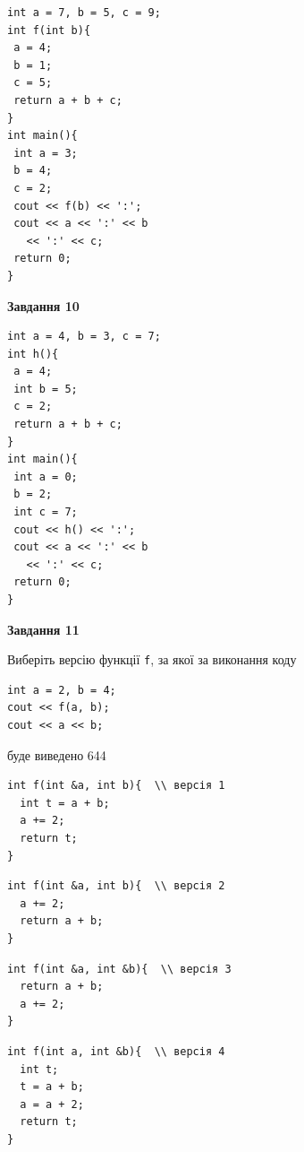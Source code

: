 \documentclass[12pt, ukrainian]{article}
\def\code#1{\Verb!#1!}
\begin{document}
{\begin {large}
\begin{minipage}[t]{7.0cm}
\begin{verbatim}
int a = 7, b = 5, c = 9;
int f(int b){
 a = 4;
 b = 1;
 c = 5;
 return a + b + c;
}
int main(){
 int a = 3;
 b = 4;
 c = 2;
 cout << f(b) << ':';
 cout << a << ':' << b 
   << ':' << c;
 return 0;
}
\end{verbatim}



\begin{center}
\textbf{Завдання 10}
\end{center}
\vspace{-8mm}

\begin{verbatim}
int a = 4, b = 3, c = 7;
int h(){
 a = 4;
 int b = 5;
 c = 2;
 return a + b + c;
}
int main(){
 int a = 0;
 b = 2;
 int c = 7;
 cout << h() << ':';
 cout << a << ':' << b 
   << ':' << c;
 return 0;
}
\end{verbatim}

\end{minipage}
\vline \hspace{1mm}
\begin{minipage}[t]{11.0cm}

\begin{center}
\textbf{Завдання 11}
\end{center}
Виберіть версію функції \code{f}, за якої за виконання коду
\begin{verbatim}
int a = 2, b = 4;
cout << f(a, b);
cout << a << b;
\end{verbatim}

буде виведено 644

\begin{verbatim}
int f(int &a, int b){  \\ версія 1
  int t = a + b;
  a += 2;
  return t;
}
\end{verbatim}

\vspace{-8mm}\begin{verbatim}
int f(int &a, int b){  \\ версія 2
  a += 2;
  return a + b;
}
\end{verbatim}

\vspace{-8mm}\begin{verbatim}
int f(int &a, int &b){  \\ версія 3
  return a + b;
  a += 2;
}
\end{verbatim}

\vspace{-8mm}\begin{verbatim}
int f(int a, int &b){  \\ версія 4
  int t;
  t = a + b;
  a = a + 2;
  return t;
}
\end{verbatim}




\end{minipage}
\end{large}}
\end{document}
